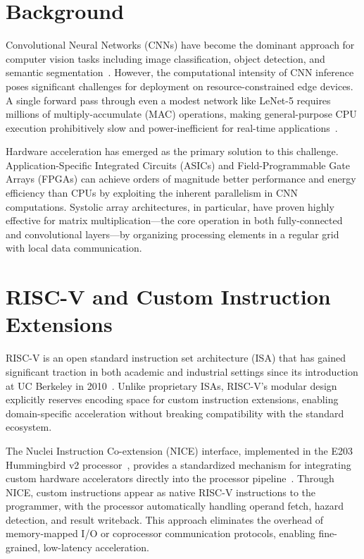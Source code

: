 

\section{Background}\label{sec:1_1}

Convolutional Neural Networks (CNNs) have become the dominant approach for computer vision tasks including image classification, object detection, and semantic segmentation~\cite{SZE_SURVEY}. However, the computational intensity of CNN inference poses significant challenges for deployment on resource-constrained edge devices. A single forward pass through even a modest network like LeNet-5 requires millions of multiply-accumulate (MAC) operations, making general-purpose CPU execution prohibitively slow and power-inefficient for real-time applications~\cite{KUNG_SYSTOLIC}.


Hardware acceleration has emerged as the primary solution to this challenge. Application-Specific Integrated Circuits (ASICs) and Field-Programmable Gate Arrays (FPGAs) can achieve orders of magnitude better performance and energy efficiency than CPUs by exploiting the inherent parallelism in CNN computations. Systolic array architectures, in particular, have proven highly effective for matrix multiplication—the core operation in both fully-connected and convolutional layers—by organizing processing elements in a regular grid with local data communication.


\section{RISC-V and Custom Instruction Extensions}\label{sec:1_2}

RISC-V is an open standard instruction set architecture (ISA) that has gained significant traction in both academic and industrial settings since its introduction at UC Berkeley in 2010~\cite{RISCV_UNPRIV_SPEC,WATERMAN_PHD,RISCV_READER}. Unlike proprietary ISAs, RISC-V’s modular design explicitly reserves encoding space for custom instruction extensions, enabling domain-specific acceleration without breaking compatibility with the standard ecosystem.


The Nuclei Instruction Co-extension (NICE) interface, implemented in the E203 Hummingbird v2 processor~\cite{NUCLEI_E203}, provides a standardized mechanism for integrating custom hardware accelerators directly into the processor pipeline~\cite{NUCLEI_NICE}. Through NICE, custom instructions appear as native RISC-V instructions to the programmer, with the processor automatically handling operand fetch, hazard detection, and result writeback. This approach eliminates the overhead of memory-mapped I/O or coprocessor communication protocols, enabling fine-grained, low-latency acceleration.


